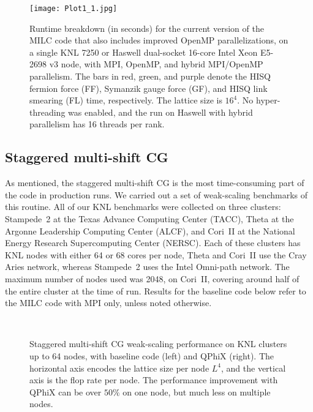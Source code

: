 \documentclass[epj]{webofc}
\begin{document}
\begin{figure}[tp]
   \centering
   {\texttt{[image: Plot1\_1.jpg]}}\hfill
   \caption{Runtime breakdown (in seconds) for the current version of the MILC code that also includes improved OpenMP parallelizations, 
on a single KNL 7250 or Haswell dual-socket 16-core Intel Xeon E5-2698 v3 node, 
   with MPI, OpenMP, and hybrid MPI/OpenMP parallelism. 
   The bars in red, green, and purple denote the HISQ fermion force (FF), 
Symanzik gauge force (GF), and HISQ link smearing (FL) time, respectively. 
   The lattice size is $16^4$. 
   No hyper-threading was enabled, 
   and the run on Haswell with hybrid parallelism has 16 threads per rank.}
   \label{Fig.1}
\end{figure}


\subsection{Staggered multi-shift CG}\label{sec-2}

As mentioned, the staggered multi-shift CG is the most time-consuming part 
of the code in production runs. 
We carried out a set of weak-scaling benchmarks of this routine. 
All of our KNL benchmarks were collected on three clusters: Stampede~2 \cite{Stampede} at the
Texas Advance Computing Center (TACC), Theta \cite{Theta} at the Argonne Leadership
Computing Center (ALCF), and Cori~II \cite{Cori} at the National Energy Research 
Supercomputing Center (NERSC). 
Each of these clusters has KNL nodes with either 64 or 68 cores per node, 
Theta and Cori~II use the Cray Aries network, whereas Stampede~2
uses the Intel Omni-path network. 
The maximum number of nodes used was 2048, on Cori~II, %
covering around half of the entire cluster at the time of run. 
Results for the baseline code below refer to the MILC code with MPI only, unless noted otherwise. \\


\begin{figure}[tp]
   \centering
    \hspace{1cm} %
    \\
   \caption{Staggered multi-shift CG weak-scaling performance on KNL clusters up to 64 nodes, with baseline code (left) and QPhiX (right). 
   The horizontal axis encodes the lattice size per node $L^4$, and the vertical axis is the flop rate per node. 
   The performance improvement with QPhiX can be over $50\%$ on one node, but much less on multiple nodes. 
   }
   \label{Fig.2}
\end{figure}
\end{document}
